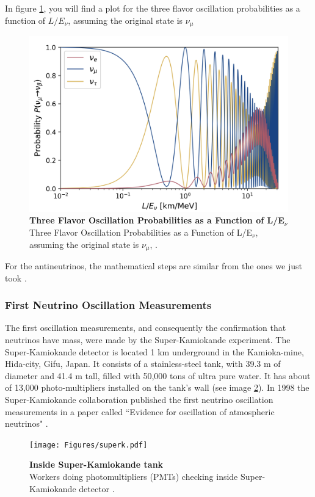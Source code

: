 In figure \ref{fig:nu_osc_prob}, you will find a plot for the three flavor oscillation probabilities as a function of $L/E_{\nu}$, assuming the original state is $\nu_{\mu}$

\begin{figure}[h!]
	\begin{center}
		\includegraphics[scale=0.2]{Figures/three_flavor_osc.jpg}
		\caption[Three Flavor Oscillation Model]{\textbf{Three Flavor Oscillation Probabilities as a Function of L/E$_{\nu}$} Three Flavor Oscillation Probabilities as a Function of L/E$_{\nu}$, assuming the original state is $\nu_{\mu}$, \cite{Lauren_thesis}.}
		\label{fig:nu_osc_prob}
	\end{center}
\end{figure}

For the antineutrinos, the mathematical steps are similar from the ones we just took \cite{oscillation_math}. 

\subsubsection{First Neutrino Oscillation Measurements}
The first oscillation measurements, and consequently the confirmation that neutrinos have mass, were made by the Super-Kamiokande experiment. The Super-Kamiokande detector is located 1 km underground in the Kamioka-mine, Hida-city, Gifu, Japan. It consists of a stainless-steel tank, with 39.3 m of diameter and 41.4 m tall, filled with 50,000 tons of ultra pure water. It has about of 13,000 photo-multipliers installed on the tank's wall (see image \ref{superk_picture}).
In 1998 the Super-Kamiokande collaboration published the first neutrino oscillation measurements in a paper called ``Evidence for oscillation of atmospheric neutrinos" \cite{first_kamioka_measure}.
%
\begin{figure}[h!]
	\begin{center}
		\texttt{[image: Figures/superk.pdf]}
		\caption[Inside Super-Kamiokande tank]{ {\textbf{Inside Super-Kamiokande tank}}\\Workers doing photomultipliers (PMTs) checking inside Super-Kamiokande detector \cite{superk_picture}.}
		\label{superk_picture}	
	\end{center}
\end{figure}
%

